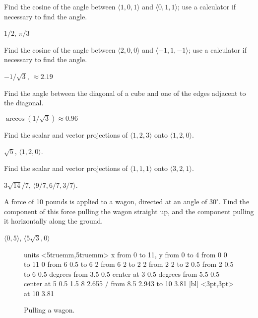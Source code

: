 \begin{enumialphparenastyle}
\begin{ex}
Find the cosine of the angle between $\langle 1,0,1 \rangle$
and $\langle 0,1,1\rangle$; use a calculator if necessary to find the angle.
\begin{sol}
	$1/2$, $\pi/3$
\end{sol}
\end{ex}

\begin{ex}
Find the cosine of the angle between $\langle 2,0,0\rangle$
and $\langle -1,1,-1\rangle$; use a calculator if necessary to find the angle.
\begin{sol}
	$-1/\sqrt3$, $\approx 2.19$
\end{sol}
\end{ex}

\begin{ex}
Find the angle between the diagonal of a cube and one of the
edges adjacent to the diagonal.
\begin{sol}
	$\arccos(1/\sqrt3)\approx 0.96$
\end{sol}
\end{ex}

\begin{ex}
Find the scalar and vector projections of $\langle 1,2,3\rangle$
onto $\langle 1,2,0\rangle$.
\begin{sol}
	$\sqrt{5}$, $\langle 1,2,0\rangle$.
\end{sol}
\end{ex}

\begin{ex}
Find the scalar and vector projections of $\langle 1,1,1\rangle$
onto $\langle 3,2,1\rangle$.
\begin{sol}
	$3\sqrt{14}/7$, $\langle 9/7,6/7,3/7\rangle$.
\end{sol}
\end{ex}

\begin{ex}
A force of 10 pounds is applied to a wagon, directed at an
angle of $30^\circ$. Find the component of this force pulling the
wagon straight up, and the component pulling it horizontally along
the ground.
\begin{sol}
	$\langle 0,5\rangle$, $\langle 5\sqrt3,0\rangle$
\end{sol}

\begin{figure}[H]
\centerline{
\vbox{\beginpicture
\normalgraphs
\setcoordinatesystem units <5truemm,5truemm>
\setplotarea x from 0 to 11, y from 0 to 4
\putrule from 0 0 to 11 0
\putrule from 6 0.5 to 6 2
\putrule from 6 2 to 2 2
\putrule from 2 2 to 2 0.5
\putrule from 2 0.5 to 6 0.5
 degrees from 3.5 0.5 center at 3 0.5
 degrees from 5.5 0.5 center at 5 0.5
 1.5 8 2.655 /
\arrow <4pt> [0.35, 1] from 8.5 2.943 to 10 3.81
 [bl] <3pt,3pt> at 10 3.81
\endpicture}}
\caption{Pulling a wagon. \label{fig:pulling a wagon}}
\end{figure}
\end{ex}


\end{enumialphparenastyle}
